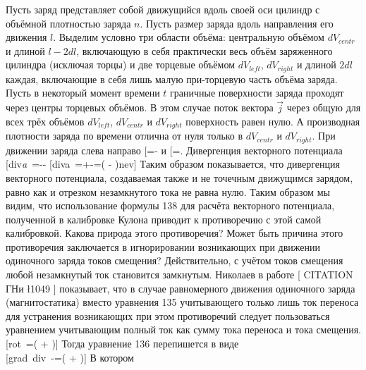 \documentclass[11pt]{article}
\begin{document}
Пусть заряд представляет собой движущийся вдоль своей оси цилиндр с
объёмной плотностью заряда \(n\). Пусть размер заряда вдоль направления
его движения \(l\). Выделим условно три области объёма: центральную
объёмом \(d{{V}_{centr}}\) и длиной \(l-2dl\), включающую в себя
практически весь объём заряженного цилиндра (исключая торцы) и две
торцевые объёмом \(d{{V}_{left}}\), \(d{{V}_{right}}\) и длиной \(2dl\)
каждая, включающие в себя лишь малую при-торцевую часть объёма заряда.
Пусть в некоторый момент времени \(t\) граничные поверхности заряда
проходят через центры торцевых объёмов. В этом случае поток вектора
\(\overrightarrow{j}\) через общую для всех трёх объёмов
\(d{{V}_{left}}\), \(d{{V}_{centr}}\) и \(d{{V}_{right}}\) поверхность
равен нулю. А производная плотности заряда по времени отлична от нуля
только в \(d{{V}_{centr}}\) и \(d{{V}_{right}}\). При движении заряда
слева направо
{[}=-\frac{nev}{2dl}{]} и
{[}=\frac{nev}{2dl}{]}.
Дивергенция векторного потенциала
{[}di{{v}\emph{{a}}~=--\int{\left( \frac{1}{{{R}_{right}}}\frac{\partial }{\partial t}{{\rho }_{right}} \right)d{{V}_{right}}}{]}
{[}di{{v}}{a}}~=+-=\left(
- \right)nev{]} Таким
образом показывается, что дивергенция векторного потенциала, создаваемая
также и не точечным движущимся зарядом, равно как и отрезком
незамкнутого тока не равна нулю. Таким образом мы видим, что
использование формулы 138 для расчёта векторного потенциала, полученной
в калибровке Кулона приводит к противоречию с этой самой калибровкой.
Какова природа этого противоречия? Может быть причина этого противоречия
заключается в игнорировании возникающих при движении одиночного заряда
токов смещения? Действительно, с учётом токов смещения любой незамкнутый
ток становится замкнутым. Николаев в работе {[} CITATION ГНи \l 1049 {]}
показывает, что в случае равномерного движения одиночного заряда
(магнитостатика) вместо уравнения 135 учитывающего только лишь ток
переноса для устранения возникающих при этом противоречий следует
пользоваться уравнением учитывающим полный ток как сумму тока переноса и
тока смещения. {[}rot~=\left(
+{{}\emph{{}} \right){]} Тогда
уравнение 136 перепишется в виде\\
{[}grad~div~-\Delta {}=\left(
+{{}}{}} \right){]} В котором
\end{document}
